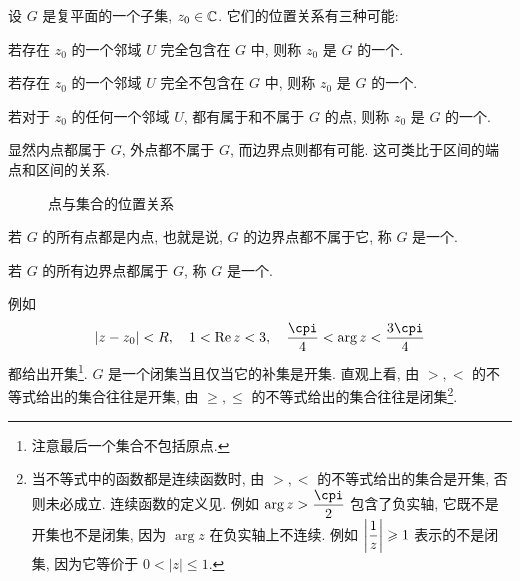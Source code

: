 设 $G$ 是复平面的一个子集, $z_0\in{\mathbb{C}}$.
它们的位置关系有三种可能:
\begin{enuma}
  \item 若存在 $z_0$ 的一个邻域 $U$ 完全包含在 $G$ 中, 则称 $z_0$ 是 $G$ 的一个.
  \item 若存在 $z_0$ 的一个邻域 $U$ 完全不包含在 $G$ 中, 则称 $z_0$ 是 $G$ 的一个.
  \item 若对于 $z_0$ 的任何一个邻域 $U$, 都有属于和不属于 $G$ 的点, 则称 $z_0$ 是 $G$ 的一个.
\end{enuma}

显然内点都属于 $G$, 外点都不属于 $G$, 而边界点则都有可能.
这可类比于区间的端点和区间的关系.

\begin{figure}[!htb]
  \centering
  \caption{点与集合的位置关系}
\end{figure}

\begin{definition}
  \begin{enuma}
    \item 若 $G$ 的所有点都是内点, 也就是说, $G$ 的边界点都不属于它, 称 $G$ 是一个.
    \item 若 $G$ 的所有边界点都属于 $G$, 称 $G$ 是一个.
  \end{enuma}
\end{definition}

例如
  \[|z-z_0|<R,\quad 1<\Re z<3,\quad\frac\cpi4<\arg z<\frac{3\cpi}4\]
都给出开集\footnote{注意最后一个集合不包括原点.}.
$G$ 是一个闭集当且仅当它的补集是开集.
直观上看, 由 $>,<$ 的不等式给出的集合往往是开集, 由 $\ge,\le$ 的不等式给出的集合往往是闭集\footnote{%
  当不等式中的函数都是连续函数时, 由 $>,<$ 的不等式给出的集合是开集, 否则未必成立.
  连续函数的定义见.
  例如 $\arg z>\dfrac\cpi2$ 包含了负实轴, 它既不是开集也不是闭集, 因为 $\arg z$ 在负实轴上不连续.
  例如 $\left|\dfrac1z\right|\geqslant 1$ 表示的不是闭集, 因为它等价于 $0<|z|\le1$.
}.

